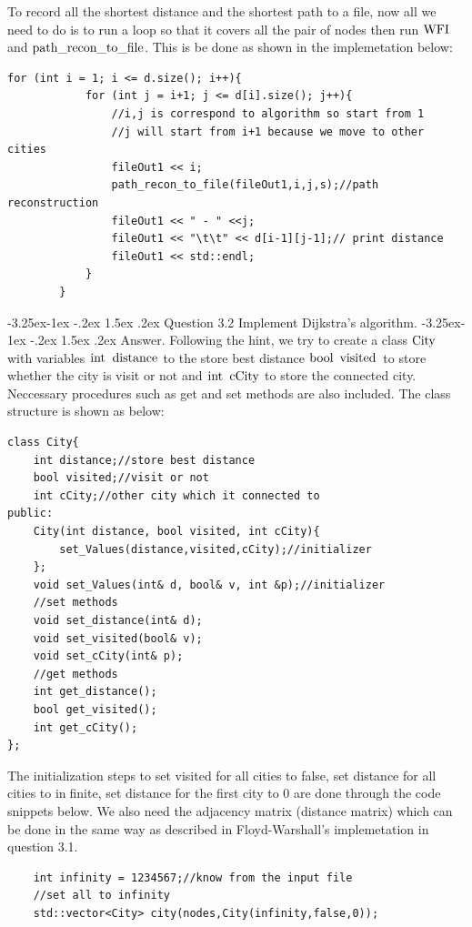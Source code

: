 \documentclass[a4paper,12pt]{article}%
\makeatletter
\renewcommand\subsection{\@startsection{subsection}{2}{\z@}%
                                     {-3.25ex\@plus -1ex \@minus -.2ex}%
                                     {1.5ex \@plus .2ex}%
                                     {\normalfont\bfseries}}
\renewcommand\subsubsection{\@startsection{subsection}{2}{\z@}%
                                     {-3.25ex\@plus -1ex \@minus -.2ex}%
                                     {1.5ex \@plus .2ex}%
                                     {\normalfont\bfseries\itshape}}%
\makeatother
\begin{document}
To record all the shortest distance and the shortest path to a file, now all we need to do is to run a loop so that it covers all the pair of nodes then run $\lstinline{WFI}$ and $\lstinline{path_recon_to_file}$. This is be done as shown in the implemetation below:
\begin{lstlisting}
for (int i = 1; i <= d.size(); i++){
            for (int j = i+1; j <= d[i].size(); j++){
                //i,j is correspond to algorithm so start from 1
                //j will start from i+1 because we move to other cities
                fileOut1 << i;
                path_recon_to_file(fileOut1,i,j,s);//path reconstruction  
                fileOut1 << " - " <<j; 
                fileOut1 << "\t\t" << d[i-1][j-1];// print distance
                fileOut1 << std::endl;
            }           
        }
\end{lstlisting}
\subsection{Question 3.2}
Implement Dijkstra's algorithm.
\subsubsection{Answer.}
Following the hint, we try to create a class $\lstinline{City}$ with variables $\lstinline{int distance}$ to the store best distance $\lstinline{bool visited}$ to store whether the city is visit or not and $\lstinline{int cCity}$ to store the connected city. Neccessary procedures such as get and set methods are also included. The class structure is shown as below:
\begin{lstlisting}[title = $\lstinline{City}$]
class City{
    int distance;//store best distance
    bool visited;//visit or not
    int cCity;//other city which it connected to
public:
    City(int distance, bool visited, int cCity){
        set_Values(distance,visited,cCity);//initializer
    };
    void set_Values(int& d, bool& v, int &p);//initializer
    //set methods
    void set_distance(int& d);
    void set_visited(bool& v);
    void set_cCity(int& p);
    //get methods
    int get_distance();
    bool get_visited();
    int get_cCity();
};
\end{lstlisting}
The initialization steps to set visited for all cities to false, set distance for all cities to infinite, set distance for the first city to 0 are done through the code snippets below. We also need the adjacency matrix (distance matrix) which can be done in the same way as described in Floyd-Warshall's implemetation in question 3.1.
\begin{lstlisting}
	int infinity = 1234567;//know from the input file
    //set all to infinity
    std::vector<City> city(nodes,City(infinity,false,0)); 
\end{lstlisting}
\end{document}
